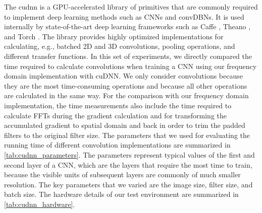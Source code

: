 The \gls{cudnn} \citep{chetlur2014} is a GPU-accelerated library of primitives
that are commonly required to implement deep learning methods such as CNNs and
convDBNs. It is used internally by state-of-the-art deep learning frameworks
such as Caffe \citep{jia2014}, Theano \citep{bastien2012}, and Torch
\citep{collobert2011torch7}. The library provides highly optimized
implementations for calculating, e.g., batched 2D and 3D convolutions, pooling
operations, and different transfer functions. In this set of experiments, we
directly compared the time required to calculate convolutions when training a
CNN using our frequency domain implementation with cuDNN. We only consider
convolutions because they are the most time-consuming operations and because all
other operations are calculated in the same way. For the comparison with our
frequency domain implementation, the time measurements also include the time
required to calculate FFTs during the gradient calculation and for transforming
the accumulated gradient to spatial domain and back in order to trim the padded
filters to the original filter size. The parameters that we used for evaluating
the running time of different convolution implementations are summarized in
\ref{tab:cudnn_parameters}. The parameters represent typical values of the first
and second layer of a CNN, which are the layers that require the most time to
train, because the visible units of subsequent layers are commonly of much
smaller resolution. The key parameters that we varied are the image size, filter
size, and batch size. The hardware details of our test environment are
summarized in \ref{tab:cudnn_hardware}.



